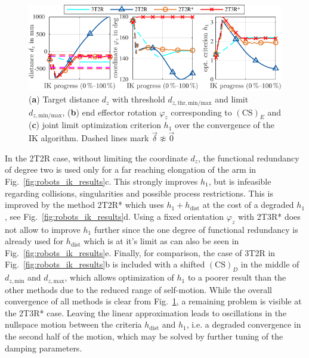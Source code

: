 \documentclass[graybox,vecphys]{svmult}
\newcommand{\ks}[1]{{(\mathrm{CS})_{#1}}}
\newcommand{\Res}[0]{\vec{\delta}}
\begin{document}
\begin{figure}[tb]
\begin{center}
\includegraphics[]{figures/ik_results.pdf}
\vspace{-0.4cm}
\caption{(\textbf{a}) Target distance $d_z$ with threshold $d_{z,\mathrm{thr,min/max}}$ and limit $d_{z,\mathrm{min/max}}$, (\textbf{b}) end effector rotation $\varphi_z$ corresponding to $\ks{E}$ and (\textbf{c}) joint limit optimization criterion $h_1$ over the convergence of the IK algorithm. Dashed lines mark $\Res \napprox \vec{0}$}
\label{fig:ik_results}
\vspace{-0.6cm}
\end{center}
\end{figure}




In the 2T2R case, without limiting the coordinate $d_z$, the functional redundancy of degree two is used only for a far reaching elongation of the arm in Fig.~\ref{fig:robots_ik_results}c.
This strongly improves $h_1$, but is infeasible regarding collisions, singularities and possible process restrictions.
This is improved by the method 2T2R* which uses $h_1+h_\mathrm{dist}$ at the cost of a degraded $h_1$, see Fig.~\ref{fig:robots_ik_results}d.
Using a fixed orientation $\varphi_z$ with 2T3R* does not allow to improve $h_1$ further since the one degree of functional redundancy is already used for $h_\mathrm{dist}$ which is at it's limit as can also be seen in Fig.~\ref{fig:robots_ik_results}e.
Finally, for comparison, the case of 3T2R in Fig.~\ref{fig:robots_ik_results}b is included with a shifted $\ks{D}$ in the middle of $d_{z,\mathrm{min}}$ and $d_{z,\mathrm{max}}$, which allows optimization of $h_1$ to a poorer result than the other methods due to the reduced range of self-motion.
While the overall convergence of all methods is clear from Fig.~\ref{fig:ik_results}, a remaining problem is visible at the 2T3R* case. 
Leaving the linear approximation leads to oscillations in the nullspace motion between the criteria $h_\mathrm{dist}$ and $h_1$, i.e. a degraded convergence in the second half of the motion, which may be solved by further tuning of the damping parameters.
\end{document}
